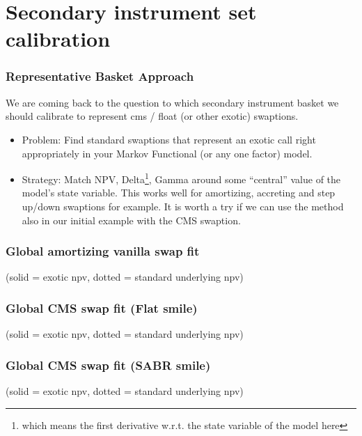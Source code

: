 \documentclass{beamer}
\begin{document}
\section{Secondary instrument set calibration}

\begin{frame}[fragile]
\frametitle{Representative Basket Approach}
We are coming back to the question to which secondary instrument basket we
should calibrate to represent cms / float (or other exotic) swaptions.
\begin{itemize}
\item Problem: Find standard swaptions that represent an exotic call right
appropriately in your Markov Functional (or any one factor) model.
\item Strategy: Match NPV, Delta\footnote{which means the first derivative
w.r.t. the state variable of the model here}, Gamma around some ``central''
value of the model's state variable.
This works well for amortizing, accreting and step up/down swaptions for
example. It is worth a try if we can use the method also in our initial
example with the CMS swaption.
\end{itemize}
\end{frame}

\begin{frame}[fragile]
\frametitle{Global amortizing vanilla swap fit}
(solid = exotic npv, dotted = standard underlying npv)
\end{frame}


\begin{frame}[fragile]
\frametitle{Global CMS swap fit (Flat smile)}
(solid = exotic npv, dotted = standard underlying npv)
\end{frame}

\begin{frame}[fragile]
\frametitle{Global CMS swap fit (SABR smile)}
(solid = exotic npv, dotted = standard underlying npv)
\end{frame}
\end{document}
